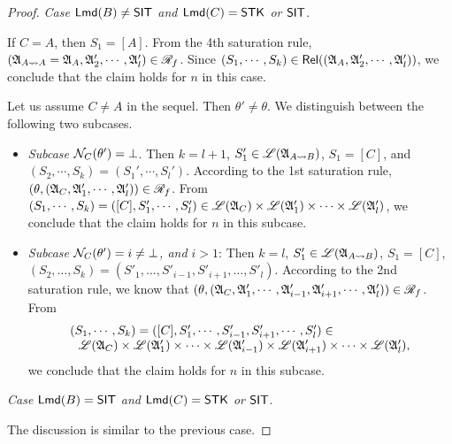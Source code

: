 \begin{proof}
\smallskip

\noindent \emph{Case ${\sf Lmd}(B) \neq {\sf SIT}$ and ${\sf Lmd}(C) = {\sf STK}$ or ${\sf SIT}$}. 

If $C = A$, then $S_1 = [A]$. From the 4th saturation rule, $({\mathfrak{A} }_{A \rightsquigarrow A} = {\mathfrak{A} }_A, {\mathfrak{A} }'_2, \cdots, {\mathfrak{A} }'_l) \in \mathscr{R}_f$. Since $(S_1, \cdots, S_k) \in \mathsf{Rel}(({\mathfrak{A} }_A, {\mathfrak{A} }'_2, \cdots, {\mathfrak{A} }'_l))$, we conclude that the claim holds for $n$ in this case. 

Let us assume $C \neq A$ in the sequel.  Then $\theta' \neq \theta$.  We distinguish between the following two subcases. 
\begin{itemize}
    \item \emph{Subcase $\mathcal{N}_{C}(\theta') = \bot$}. Then $k=l+1$, $S_1' \in {\mathscr{L} }({\mathfrak{A} }_{A\rightsquigarrow B})$, $S_1=[C]$, and $(S_2,\cdots,S_k)=(S_1',\cdots,S_l')$.  According to the 1st saturation rule, $(\theta, ({\mathfrak{A} }_{C}, {\mathfrak{A} }_1', \cdots, {\mathfrak{A} }_l')) \in \mathscr{R}_f$.
   From $(S_1, \cdots, S_k) = ([C], S_1', \cdots, S_l') \in {\mathscr{L} }({\mathfrak{A} }_{C}) \times {\mathscr{L} }({\mathfrak{A} }_1') \times \cdots \times {\mathscr{L} }({\mathfrak{A} }_l')$, we conclude that the claim holds for $n$ in this subcase.
    \item \emph{Subcase $\mathcal{N}_{C}(\theta') = i \neq \bot$, and $i > 1$}: Then $k = l$, 
    $S'_1  \in {\mathscr{L} }({\mathfrak{A} }_{A\rightsquigarrow B})$, $S_1 = [C]$, $(S_2, \dots, S_k) = (S'_1, \dots, S'_{i-1}, S'_{i+1}, \dots, S'_l)$. According to the 2nd saturation rule, we know that $(\theta, ({\mathfrak{A} }_{C}, {\mathfrak{A} }_1',\cdots, {\mathfrak{A} }_{i-1}', {\mathfrak{A} }_{i+1}', \cdots, {\mathfrak{A} }_{l}')) \in \mathscr{R}_f$. 
    From 
    $$
    \begin{array}{l}
    	(S_1,\cdots,S_k) = ([C], S_1', \cdots, S_{i-1}', S_{i+1}', \cdots, S_l') \in \\
    	\ \ {\mathscr{L} }({\mathfrak{A} }_{C}) \times {\mathscr{L} }({\mathfrak{A} }_1') \times \cdots \times {\mathscr{L} }({\mathfrak{A} }_{i-1}') \times {\mathscr{L} }({\mathfrak{A} }_{i+1}')\times \cdots \times {\mathscr{L} }({\mathfrak{A} }_{l}'),
    \end{array}
    $$  
    we conclude that the claim holds for $n$ in this subcase. 
%
\end{itemize}

\smallskip

\noindent \emph{Case ${\sf Lmd}(B) = {\sf SIT}$ and ${\sf Lmd}(C) = {\sf STK}$ or ${\sf SIT}$}. 

The discussion is similar to the previous case. 



\end{proof}
